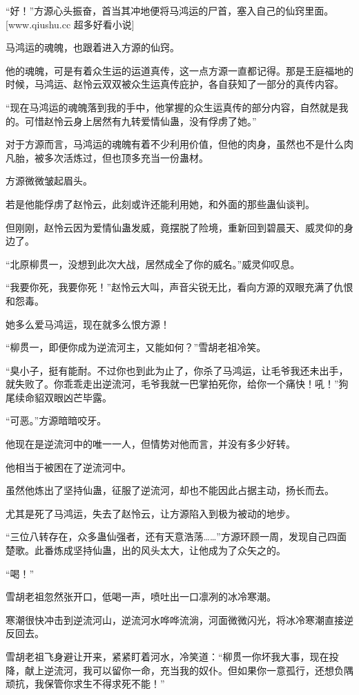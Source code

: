 \begin{this_body}
“好！”方源心头振奋，首当其冲地便将马鸿运的尸首，塞入自己的仙窍里面。[www.qiushu.cc 超多好看小说]

马鸿运的魂魄，也跟着进入方源的仙窍。

他的魂魄，可是有着众生运的运道真传，这一点方源一直都记得。那是王庭福地的时候，马鸿运、赵怜云双双被众生运真传庇护，各自获知了一部分的真传内容。

“现在马鸿运的魂魄落到我的手中，他掌握的众生运真传的部分内容，自然就是我的。可惜赵怜云身上居然有九转爱情仙蛊，没有俘虏了她。”

对于方源而言，马鸿运的魂魄有着不少利用价值，但他的肉身，虽然也不是什么肉凡胎，被多次活炼过，但也顶多充当一份蛊材。

方源微微皱起眉头。

若是他能俘虏了赵怜云，此刻或许还能利用她，和外面的那些蛊仙谈判。

但刚刚，赵怜云因为爱情仙蛊发威，竟摆脱了险境，重新回到碧晨天、威灵仰的身边了。

“北原柳贯一，没想到此次大战，居然成全了你的威名。”威灵仰叹息。

“我要你死，我要你死！”赵怜云大叫，声音尖锐无比，看向方源的双眼充满了仇恨和怨毒。

她多么爱马鸿运，现在就多么恨方源！

“柳贯一，即便你成为逆流河主，又能如何？”雪胡老祖冷笑。

“臭小子，挺有能耐。不过你也到此为止了，你杀了马鸿运，让毛爷我还未出手，就失败了。你乖乖走出逆流河，毛爷我就一巴掌拍死你，给你一个痛快！吼！”狗尾续命貂双眼凶芒毕露。

“可恶。”方源暗暗咬牙。

他现在是逆流河中的唯一一人，但情势对他而言，并没有多少好转。

他相当于被困在了逆流河中。

虽然他炼出了坚持仙蛊，征服了逆流河，却也不能因此占据主动，扬长而去。

尤其是死了马鸿运，失去了赵怜云，让方源陷入到极为被动的地步。

“三位八转存在，众多蛊仙强者，还有天意浩荡……”方源环顾一周，发现自己四面楚歌。此番炼成坚持仙蛊，出的风头太大，让他成为了众矢之的。

“喝！”

雪胡老祖忽然张开口，低喝一声，喷吐出一口凛冽的冰冷寒潮。

寒潮很快冲击到逆流河山，逆流河水哗哗流淌，河面微微闪光，将冰冷寒潮直接逆反回去。

雪胡老祖飞身避让开来，紧紧盯着河水，冷笑道：“柳贯一你坏我大事，现在投降，献上逆流河，我可以留你一命，充当我的奴仆。但如果你一意孤行，还想负隅顽抗，我保管你求生不得求死不能！”


\end{this_body}
